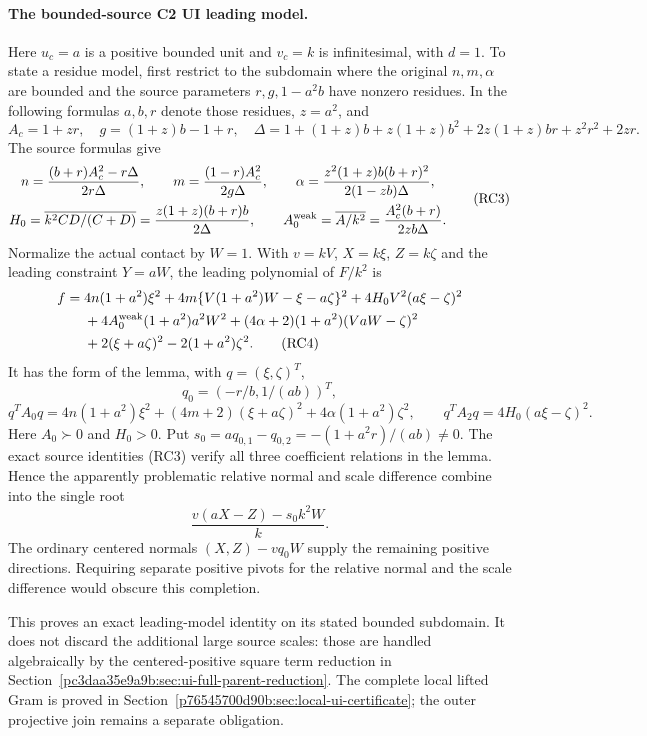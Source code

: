 \paragraph{The bounded-source C2 UI leading model.}
Here $u_c=a$ is a positive bounded unit and $v_c=k$ is
infinitesimal, with $d=1$. To state a residue model, first restrict
to the subdomain where the original $n,m,\alpha$ are bounded and
the source parameters $r,g,1-a^2b$ have nonzero residues. In the
following formulas $a,b,r$ denote those residues, $z=a^2$, and
\[
 A_c=1+zr,\quad g=(1+z)b-1+r,\quad
 \Delta=1+(1+z)b+z(1+z)b^2+2z(1+z)br+z^2r^2+2zr.
\]
The source formulas give
\[
\begin{gathered}
 n=\frac{(b+r)A_c^2-r\Delta}{2r\Delta},\qquad
 m=\frac{(1-r)A_c^2}{2g\Delta},\qquad
 \alpha=\frac{z^2(1+z)b(b+r)^2}{2(1-zb)\Delta},\\
 H_0=\overline{k^2CD/(C+D)}
       =\frac{z(1+z)(b+r)b}{2\Delta},\qquad
 A_0^{\rm weak}=\overline{A/k^2}
       =\frac{A_c^2(b+r)}{2zb\Delta}.
\end{gathered}                                                   \tag{RC3}
\]
Normalize the actual contact by $W=1$. With $v=kV$, $X=k\xi$,
$Z=k\zeta$ and the leading constraint $Y=aW$, the leading
polynomial of $F/k^2$ is
\begin{align*}
 f={}&4n(1+a^2)\xi^2
 +4m\{V(1+a^2)W-\xi-a\zeta\}^2
 +4H_0V^2(a\xi-\zeta)^2\\
 &+4A_0^{\rm weak}(1+a^2)a^2W^2
 +(4\alpha+2)(1+a^2)(VaW-\zeta)^2\\
 &+2(\xi+a\zeta)^2-2(1+a^2)\zeta^2.               \tag{RC4}
\end{align*}
It has the form of the lemma, with $q=(\xi,\zeta)^T$,
\[
 q_0=(-r/b,1/(ab))^T,
\]
\[
 q^TA_0q=4n(1+a^2)\xi^2+(4m+2)(\xi+a\zeta)^2
                      +4\alpha(1+a^2)\zeta^2,
 \qquad q^TA_2q=4H_0(a\xi-\zeta)^2.
\]
Here $A_0\succ0$ and $H_0>0$. Put
$s_0=aq_{0,1}-q_{0,2}=-(1+a^2r)/(ab)\ne0$.
The exact source identities (RC3) verify all three coefficient
relations in the lemma. Hence the apparently problematic relative
normal and scale difference combine into the single root
\[
             \frac{v(aX-Z)-s_0k^2W}{k}.             \tag{RC5}
\]
The ordinary centered normals $(X,Z)-vq_0W$ supply the remaining
positive directions. Requiring separate positive pivots for the
relative normal and the scale difference would obscure this
completion.

This proves an exact leading-model identity on its stated bounded
subdomain. It does not discard the additional large source scales:
those are handled algebraically by the centered-positive square term reduction in
Section~\ref{pc3daa35e9a9b:sec:ui-full-parent-reduction}. The complete local lifted
Gram is proved in Section~\ref{p76545700d90b:sec:local-ui-certificate}; the outer
projective join remains a separate obligation.

